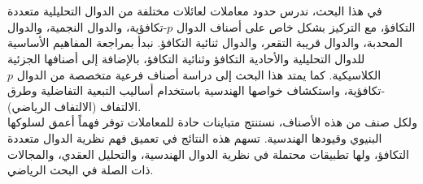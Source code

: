 \chapter*{}

\begin{Arabic}
	\doublespacing
	في هذا البحث، ندرس حدود معاملات لعائلات مختلفة من الدوال التحليلية متعددة التكافؤ، مع التركيز بشكل خاص على أصناف الدوال $p$-تكافؤية، والدوال النجمية، والدوال المحدبة، والدوال قريبة التقعر، والدوال ثنائية التكافؤ. نبدأ بمراجعة المفاهيم الأساسية للدوال التحليلية والأحادية التكافؤ وثنائية التكافؤ، بالإضافة إلى أصنافها الجزئية الكلاسيكية. كما يمتد هذا البحث إلى دراسة أصناف فرعية متخصصة من الدوال $p$-تكافؤية، واستكشاف خواصها الهندسية باستخدام أساليب التبعية التفاضلية وطرق الالتفاف (الالتفاف الرياضي).\\[10pt]
	ولكل صنف من هذه الأصناف، نستنتج متباينات حادة للمعاملات توفر فهماً أعمق لسلوكها البنيوي وقيودها الهندسية. تسهم هذه النتائج في تعميق فهم نظرية الدوال متعددة التكافؤ، ولها تطبيقات محتملة في نظرية الدوال الهندسية، والتحليل العقدي، والمجالات ذات الصلة في البحث الرياضي.
\end{Arabic}